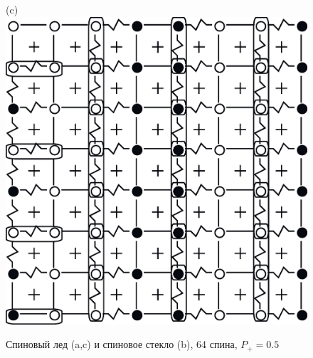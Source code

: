 \documentclass[utf8, babel, sor, jor, amsmath, amssymb, reprint]{elsarticle} %
\begin{document}
\begin{figure}[H]
\begin{minipage}[h]{0.3\linewidth}
	\end{minipage}
	\hfill
	\begin{minipage}[h]{0.3\linewidth}
		\centering(c)
		\includegraphics[width=1\linewidth]{pictures/SI_64_J0}
	\end{minipage}
	\hfill
	\caption{Спиновый лед (a,c) и спиновое стекло (b), 64 спина, $P_+ = 0.5$}
	\label{fig:cell_SI_SG_64}

\end{figure}
\end{document}
